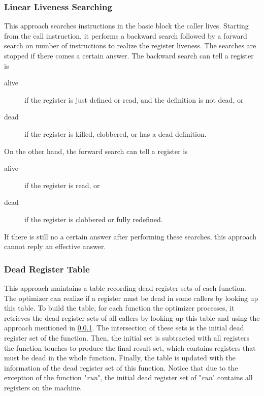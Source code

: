 \documentclass[acmsmall]{acmart}
\begin{document}
\subsubsection{Linear Liveness Searching}
\label{subsubsec:linear-search}
This approach searches instructions in the basic block the caller lives. Starting from the call instruction, it performs a backward search followed by a forward search on number of instructions to realize the register liveness. The searches are stopped if there comes a certain answer. The backward search can tell a register is
\begin{description}
	\item[alive] if the register is just defined or read, and the definition is not dead, or
	\item[dead] if the register is killed, clobbered, or has a dead definition.
\end{description}
On the other hand, the forward search can tell a register is
\begin{description}
	\item[alive] if the register is read, or
	\item[dead] if the register is clobbered or fully redefined.
\end{description}
If there is still no a certain answer after performing these searches, this approach cannot reply an effective answer.

\subsubsection{Dead Register Table}
\label{subsubsec:dead-table}
This approach maintains a table recording dead register sets of each function. The optimizer can realize if a register must be dead in some callers by looking up this table. To build the table, for each function the optimizer processes, it retrieves the dead register sets of all callers by looking up this table and using the approach mentioned in \ref{subsubsec:linear-search}. The intersection of these sets is the initial dead register set of the function. Then, the initial set is subtracted with all registers the function touches to produce the final result set, which contains registers that must be dead in the whole function. Finally, the table is updated with the information of the dead register set of this function. Notice that due to the exception of the function "\textit{run}", the initial dead register set of "\textit{run}" contains all registers on the machine.
\end{document}

